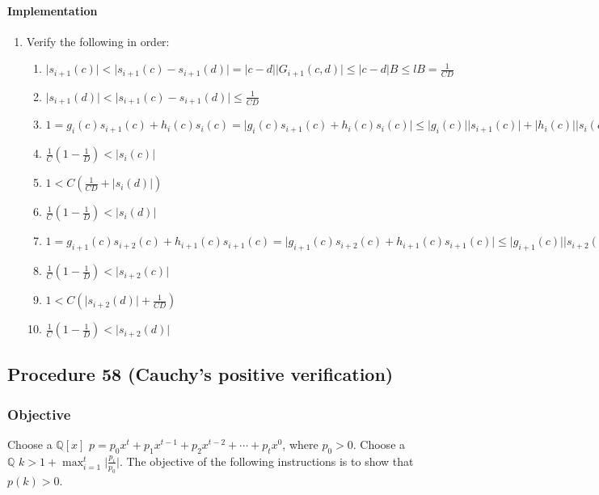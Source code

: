 \documentclass[twocolumn]{article}
\begin{document}
				\paragraph{Implementation}
					\begin{enumerate}
						\item Verify the following in order:
						\begin{enumerate}
							\item $\lvert s_{i+1}(c)\rvert<\lvert s_{i+1}(c)-s_{i+1}(d)\rvert=\lvert c-d\rvert\lvert G_{i+1}(c,d)\rvert\le\lvert c-d\rvert B\le lB=\frac{1}{CD}$
							\item $\lvert s_{i+1}(d)\rvert<\lvert s_{i+1}(c)-s_{i+1}(d)\rvert\le\frac{1}{CD}$
							\item $1=g_{i}(c)s_{i+1}(c)+h_{i}(c)s_{i}(c)=\lvert g_{i}(c)s_{i+1}(c)+h_{i}(c)s_{i}(c)\rvert\le\lvert g_{i}(c)\rvert\lvert s_{i+1}(c)\rvert+\lvert h_{i}(c)\rvert\lvert s_{i}(c)\rvert<C(\frac{1}{CD}+\lvert s_{i}(c)\rvert)$
							\item $\frac{1}{C}(1-\frac{1}{D})<\lvert s_{i}(c)\rvert$
							\item $1<C(\frac{1}{CD}+\lvert s_{i}(d)\rvert)$
							\item $\frac{1}{C}(1-\frac{1}{D})<\lvert s_{i}(d)\rvert$
							\item $1=g_{i+1}(c)s_{i+2}(c)+h_{i+1}(c)s_{i+1}(c)=\lvert g_{i+1}(c)s_{i+2}(c)+h_{i+1}(c)s_{i+1}(c)\rvert\le\lvert g_{i+1}(c)\rvert\lvert s_{i+2}(c)\rvert+\lvert h_{i+1}(c)\rvert\lvert s_{i+1}(c)\rvert<C(\lvert s_{i+2}(c)\rvert+\frac{1}{CD})$
							\item $\frac{1}{C}(1-\frac{1}{D})<\lvert s_{i+2}(c)\rvert$
							\item $1<C(\lvert s_{i+2}(d)\rvert+\frac{1}{CD})$
							\item $\frac{1}{C}(1-\frac{1}{D})<\lvert s_{i+2}(d)\rvert$
						\end{enumerate}
					\end{enumerate}
		\subsection{Procedure 58 (Cauchy's positive verification)}\label{sec:procedure 58}
			\subsubsection{Objective}
				Choose a $\mathbb{Q}[x]$ $p=p_0x^t+p_1x^{t-1}+p_2x^{t-2}+\cdots+p_tx^0$, where $p_0>0$. Choose a $\mathbb{Q}$ $k>1+\max_{i=1}^t\lvert\frac{p_i}{p_0}\rvert$. The objective of the following instructions is to show that $p(k)>0$.
\end{document}
